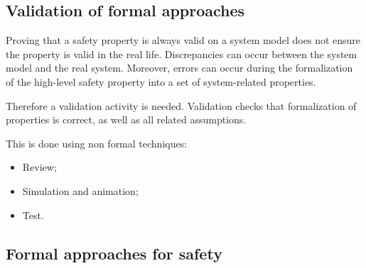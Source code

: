 \subsection{Validation of formal approaches}

Proving that a safety property is always valid on a system model does
not ensure the property is valid in the real life. Discrepancies can
occur between the system model and the real system. Moreover, errors
can occur during the formalization of the high-level safety property
into a set of system-related properties.

Therefore a validation activity is needed. Validation checks that
formalization of properties is correct, as well as all related
assumptions.

This is done using non formal techniques:
\begin{itemize}
\item Review;
\item Simulation and animation;
\item Test.
\end{itemize}

\subsection{Formal approaches for safety}

\begin{comment}
proof of safety requirements, static analysis, safety analysis, traceability,...
\end{comment}




